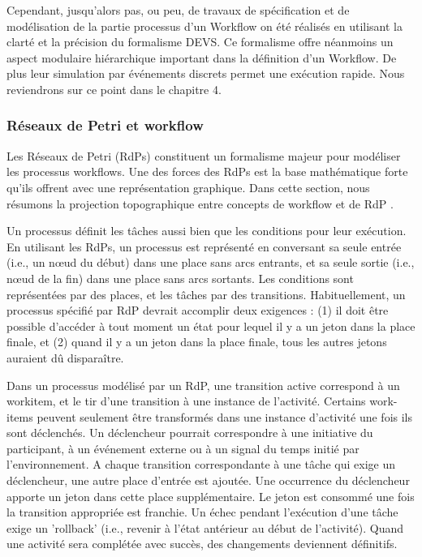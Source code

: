 Cependant, jusqu’alors pas, ou peu, de travaux de spécification et de modélisation de la partie processus d’un Workflow on été réalisés en utilisant la clarté et la précision du formalisme DEVS. Ce formalisme offre néanmoins un aspect modulaire hiérarchique important dans la définition d’un Workflow. De plus leur simulation par événements discrets permet une exécution rapide. Nous reviendrons sur ce point dans le chapitre 4. 

\subsubsection{Réseaux de Petri et workflow
}
Les Réseaux de Petri (RdPs) \parencite{RdPs} constituent un formalisme majeur pour modéliser les processus workflows. Une des forces des RdPs est la base mathématique forte qu'ils offrent avec une représentation graphique. Dans cette section, nous résumons la projection topographique entre concepts de workflow et de RdP .%

Un processus définit les tâches aussi bien que les conditions pour leur exécution. En utilisant les RdPs, un processus est représenté en conversant sa seule entrée (i.e., un nœud du début) dans une place sans arcs entrants, et sa seule sortie (i.e., nœud de la fin) dans une place sans arcs sortants. Les conditions sont représentées par des places, et les tâches par des transitions. Habituellement, un processus spécifié par RdP devrait accomplir deux exigences : (1) il doit être possible d'accéder à tout moment un état pour lequel il y a un jeton dans la place finale, et (2) quand il y a un jeton dans la place finale, tous les autres jetons auraient dû disparaître.

Dans un processus modélisé par un RdP, une transition active correspond à un workitem, et le tir d'une transition à une instance de l'activité. Certains work-items peuvent seulement être transformés dans une instance d'activité une fois ils sont déclenchés. Un déclencheur pourrait correspondre à une initiative du participant, à un événement externe ou à un signal du temps initié par l'environnement. A chaque transition correspondante à une tâche qui exige un déclencheur, une autre place d'entrée est ajoutée. Une occurrence du déclencheur apporte un jeton dans cette place supplémentaire. Le jeton est consommé une fois la transition appropriée est franchie. Un échec pendant l'exécution d'une tâche exige un 'rollback' (i.e., revenir à l'état antérieur au début de l'activité). Quand une activité sera complétée avec succès, des changements deviennent définitifs.

